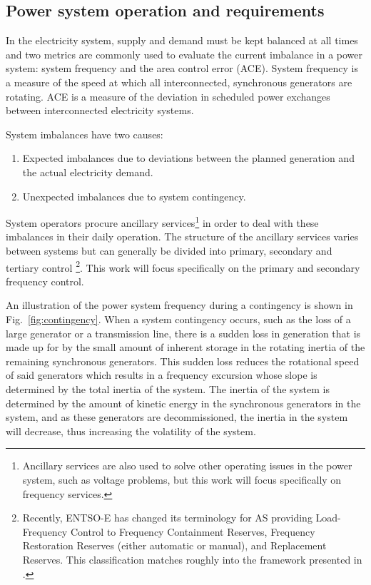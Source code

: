 \subsection{Power system operation and requirements}

In the electricity system, supply and demand must be kept balanced at all times and two metrics are commonly used to evaluate the current imbalance in a power system: system frequency and the area control error (ACE). System frequency is a measure of the speed at which all interconnected, synchronous generators are rotating.  ACE is a measure of the deviation in scheduled power exchanges between interconnected electricity systems.

System imbalances have two causes:
\begin{enumerate}
\item Expected imbalances due to deviations between the planned generation and the actual electricity demand.
\item Unexpected imbalances due to system contingency.
\end{enumerate}

System operators procure ancillary services\footnote{Ancillary services are also used to solve other operating issues in the power system, such as voltage problems, but this work will focus specifically on frequency services.} in order to deal with these imbalances in their daily operation. The structure of the ancillary services varies between systems but can generally be divided into primary, secondary and tertiary control \footnote{Recently, ENTSO-E has changed its terminology for AS providing Load-Frequency Control to Frequency Containment Reserves, Frequency Restoration Reserves (either automatic or manual), and Replacement Reserves\cite{entsoe2013network}. This classification matches roughly into the framework presented in \cite{Rebours}.}\cite{Rebours}. This work will focus specifically on the primary and secondary frequency control.%

An illustration of the power system frequency during a contingency is shown in Fig.~\ref{fig:contingency}. When a system contingency occurs, such as the loss of a large generator or a transmission line, there is a sudden loss in generation that is made up for by the small amount of inherent storage in the rotating inertia of the remaining synchronous generators. This sudden loss reduces the rotational speed of said generators which results in a frequency excursion whose slope is determined by the total inertia of the system. The inertia of the system is determined by the amount of kinetic energy in the synchronous generators in the system, and as these generators are decommissioned, the inertia in the system will decrease, thus increasing the volatility of the system.

